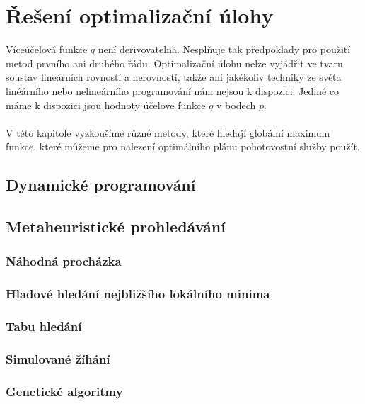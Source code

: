 \chapter{Řešení optimalizační úlohy}\label{chap:reseniOptUloh}

Víceúčelová funkce $q$ není derivovatelná.
Nesplňuje tak předpoklady pro použití metod prvního ani druhého řádu.
Optimalizační úlohu nelze vyjádřit ve tvaru soustav lineárních rovností a nerovností, takže ani jakékoliv techniky ze světa linéárního nebo nelineárního programování nám nejsou k dispozici.
Jediné co máme k dispozici jsou hodnoty účelove funkce $q$ v bodech $p$.
\\
\\
V této kapitole vyzkoušíme různé metody, které hledají globální maximum funkce, které můžeme pro nalezení optimálního plánu pohotovostní služby použít.

\section{Dynamické programování}\label{kap:dynamicProgram}

\section{Metaheuristické prohledávání}\label{kap:metaheur}

\subsection{Náhodná procházka}

\subsection{Hladové hledání nejbližšího lokálního minima}

\subsection{Tabu hledání}

\subsection{Simulované žíhání}

\subsection{Genetické algoritmy}

